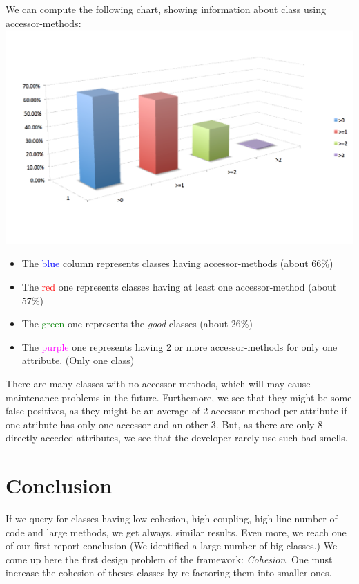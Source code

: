 \documentclass[11pt,a4paper]{article}
\begin{document}
We can compute the following chart, showing information about class using accessor-methods:\\
\includegraphics[width=\textwidth]{accessor.png}
\begin{itemize} 
\item The \textcolor{blue}{blue} column represents classes having accessor-methods (about 66\%)
\item The \textcolor{red}{red} one represents classes having at least one accessor-method (about 57\%)
\item The \textcolor{green}{green} one represents the \textit{good} classes (about 26\%)
\item The \textcolor{magenta}{purple} one represents having 2 or more accessor-methods for only one attribute. (Only one class)
\end{itemize}
There are many classes with no accessor-methods, which will may cause maintenance problems in the future. Furthemore, we see that they might be some false-positives, as they might be an average of 2 accessor method per attribute if one atribute has only one accessor and an other 3. But, as there are only 8 directly acceded attributes, we see that the developer rarely use such bad smells.  


\section{Conclusion}
If we query for classes having low cohesion, high coupling, high line number of code and large methods, we get always. similar results. Even more, we reach one of our first report conclusion (We identified a large number of big classes.) We come up here the first design problem of the framework: \emph{Cohesion}. One must increase the cohesion of theses classes by re-factoring them into smaller ones.\\
\end{document}
